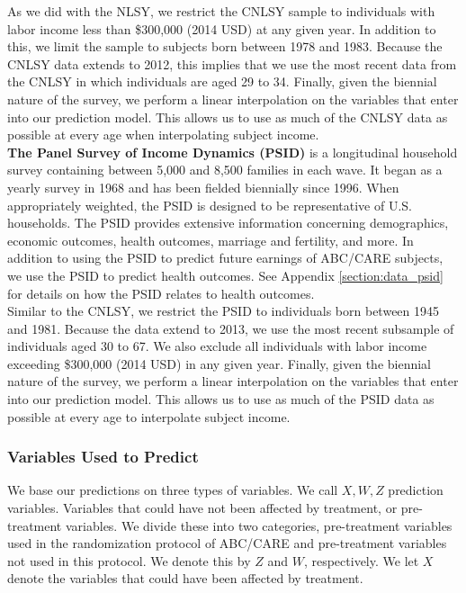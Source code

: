 \noindent As we did with the NLSY, we restrict the CNLSY sample to individuals with labor income less than \$300,000 (2014 USD) at any given year. In addition to this, we limit the sample to subjects born between 1978 and 1983. Because the CNLSY data extends to 2012, this implies that we use the most recent data from the CNLSY in which individuals are aged 29 to 34. Finally, given the biennial nature of the survey, we perform a linear interpolation on the variables that enter into our prediction model. This allows us to use as much of the CNLSY data as possible at every age when interpolating subject income. \\

\noindent \textbf{The Panel Survey of Income Dynamics (PSID)} is a longitudinal household survey containing between 5,000 and 8,500 families in each wave. It began as a yearly survey in 1968 and has been fielded biennially since 1996. When appropriately weighted, the PSID is designed to be representative of U.S. households. The PSID provides extensive information concerning demographics, economic outcomes, health outcomes, marriage and fertility, and more. In addition to using the PSID to predict future earnings of ABC/CARE subjects, we use the PSID to predict health outcomes. See Appendix \ref{section:data_psid} for details on how the PSID relates to health outcomes. \\

\noindent Similar to the CNLSY, we restrict the PSID to individuals born between 1945 and 1981. Because the data extend to 2013, we use the most recent subsample of individuals aged 30 to 67. We also exclude all individuals with labor income exceeding \$300,000 (2014 USD) in any given year. Finally, given the biennial nature of the survey, we perform a linear interpolation on the variables that enter into our prediction model. This allows us to use as much of the PSID data as possible at every age to interpolate subject income. \\

\subsubsection{Variables Used to Predict}

\noindent We base our predictions on three types of variables. We call $X,W,Z$ prediction variables. Variables that could have not been affected by treatment, or pre-treatment variables. We divide these into two categories, pre-treatment variables used in the randomization protocol of ABC/CARE and pre-treatment variables not used in this protocol. We denote this by $Z$ and $W$, respectively. We let $X$ denote  the variables that could have been affected by treatment.\\

